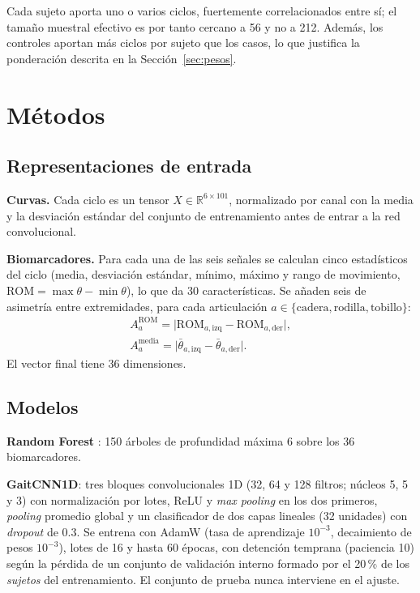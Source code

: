 \documentclass[10pt,twocolumn,a4paper]{article}
\begin{document}
Cada sujeto aporta uno o varios ciclos, fuertemente correlacionados entre sí; el tamaño muestral efectivo es por tanto cercano a 56 y no a 212. Además, los controles aportan más ciclos por sujeto que los casos, lo que justifica la ponderación descrita en la Sección~\ref{sec:pesos}.

\section{Métodos}

\subsection{Representaciones de entrada}

\textbf{Curvas.} Cada ciclo es un tensor $X \in \mathbb{R}^{6\times 101}$, normalizado por canal con la media y la desviación estándar del conjunto de entrenamiento antes de entrar a la red convolucional.

\textbf{Biomarcadores.} Para cada una de las seis señales se calculan cinco estadísticos del ciclo (media, desviación estándar, mínimo, máximo y rango de movimiento, $\mathrm{ROM}=\max\theta-\min\theta$), lo que da 30 características. Se añaden seis de asimetría entre extremidades, para cada articulación $a\in\{\text{cadera},\text{rodilla},\text{tobillo}\}$:
\begin{gather}
A^{\mathrm{ROM}}_a = \bigl|\mathrm{ROM}_{a,\mathrm{izq}}-\mathrm{ROM}_{a,\mathrm{der}}\bigr|,\\
A^{\mathrm{media}}_a = \bigl|\bar\theta_{a,\mathrm{izq}}-\bar\theta_{a,\mathrm{der}}\bigr|.
\end{gather}
El vector final tiene 36 dimensiones.

\subsection{Modelos}

\textbf{Random Forest} \cite{breiman2001}: 150 árboles de profundidad máxima 6 sobre los 36 biomarcadores.

\textbf{GaitCNN1D}: tres bloques convolucionales 1D (32, 64 y 128 filtros; núcleos 5, 5 y 3) con normalización por lotes, ReLU y \emph{max pooling} en los dos primeros, \emph{pooling} promedio global y un clasificador de dos capas lineales (32 unidades) con \emph{dropout} de 0.3. Se entrena con AdamW (tasa de aprendizaje $10^{-3}$, decaimiento de pesos $10^{-3}$), lotes de 16 y hasta 60 épocas, con detención temprana (paciencia 10) según la pérdida de un conjunto de validación interno formado por el 20\,\% de los \emph{sujetos} del entrenamiento. El conjunto de prueba nunca interviene en el ajuste.
\end{document}
